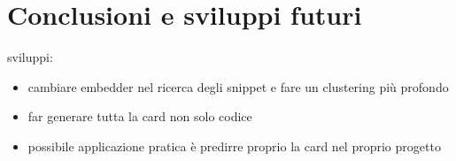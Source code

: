 \documentclass{article}
\begin{document}
\section{Conclusioni e sviluppi futuri}
sviluppi:
\begin{itemize}
    \item cambiare embedder nel ricerca degli snippet e fare un clustering più profondo
    \item far generare tutta la card non solo codice
    \item possibile applicazione pratica è predirre proprio la card nel proprio progetto
\end{itemize}



\appendix
\end{document}
